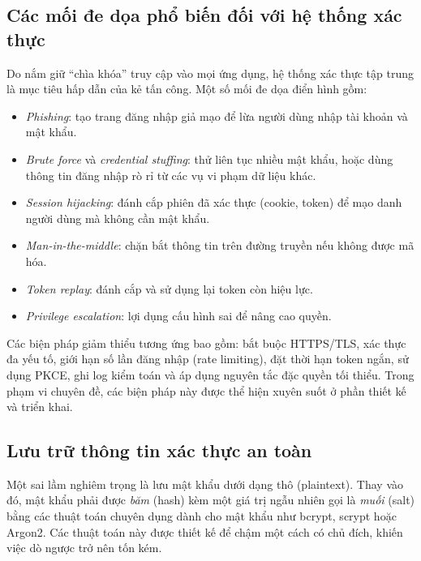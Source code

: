 
\subsection{Các mối đe dọa phổ biến đối với hệ thống xác thực}
\label{subsec:threats}

Do nắm giữ ``chìa khóa'' truy cập vào mọi ứng dụng, hệ thống xác thực tập trung
là mục tiêu hấp dẫn của kẻ tấn công. Một số mối đe dọa điển hình gồm:

\begin{itemize}
  \item \textit{Phishing}: tạo trang đăng nhập giả mạo để lừa người dùng nhập
  tài khoản và mật khẩu.
  \item \textit{Brute force} và \textit{credential stuffing}: thử liên tục
  nhiều mật khẩu, hoặc dùng thông tin đăng nhập rò rỉ từ các vụ vi phạm dữ liệu
  khác.
  \item \textit{Session hijacking}: đánh cắp phiên đã xác thực (cookie, token)
  để mạo danh người dùng mà không cần mật khẩu.
  \item \textit{Man-in-the-middle}: chặn bắt thông tin trên đường truyền nếu
  không được mã hóa.
  \item \textit{Token replay}: đánh cắp và sử dụng lại token còn hiệu lực.
  \item \textit{Privilege escalation}: lợi dụng cấu hình sai để nâng cao quyền.
\end{itemize}

Các biện pháp giảm thiểu tương ứng bao gồm: bắt buộc HTTPS/TLS, xác thực đa
yếu tố, giới hạn số lần đăng nhập (rate limiting), đặt thời hạn token ngắn, sử
dụng PKCE, ghi log kiểm toán và áp dụng nguyên tắc đặc quyền tối thiểu. Trong
phạm vi chuyên đề, các biện pháp này được thể hiện xuyên suốt ở phần thiết kế
và triển khai.

\subsection{Lưu trữ thông tin xác thực an toàn}
\label{subsec:hashing}

Một sai lầm nghiêm trọng là lưu mật khẩu dưới dạng thô (plaintext). Thay vào
đó, mật khẩu phải được \textit{băm} (hash) kèm một giá trị ngẫu nhiên gọi là
\textit{muối} (salt) bằng các thuật toán chuyên dụng dành cho mật khẩu như
bcrypt, scrypt hoặc Argon2. Các thuật toán này được thiết kế để chậm một cách
có chủ đích, khiến việc dò ngược trở nên tốn kém.

